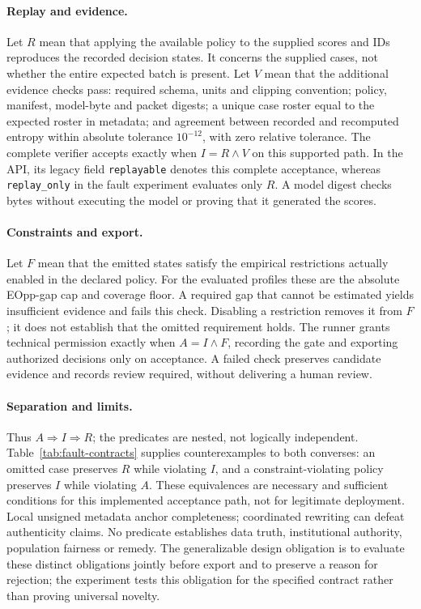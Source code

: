 \paragraph{Replay and evidence.}
Let $R$ mean that applying the available policy to the supplied scores and IDs reproduces the recorded decision states. It concerns the supplied cases, not whether the entire expected batch is present. Let $V$ mean that the additional evidence checks pass: required schema, units and clipping convention; policy, manifest, model-byte and packet digests; a unique case roster equal to the expected roster in metadata; and agreement between recorded and recomputed entropy within absolute tolerance $10^{-12}$, with zero relative tolerance. The complete verifier accepts exactly when $I=R\land V$ on this supported path. In the API, its legacy field \texttt{replayable} denotes this complete acceptance, whereas \texttt{replay\_only} in the fault experiment evaluates only $R$. A model digest checks bytes without executing the model or proving that it generated the scores.

\paragraph{Constraints and export.}
Let $F$ mean that the emitted states satisfy the empirical restrictions actually enabled in the declared policy. For the evaluated profiles these are the absolute EOpp-gap cap and coverage floor. A required gap that cannot be estimated yields insufficient evidence and fails this check. Disabling a restriction removes it from $F$; it does not establish that the omitted requirement holds. The runner grants technical permission exactly when $A=I\land F$, recording the gate and exporting authorized decisions only on acceptance. A failed check preserves candidate evidence and records review required, without delivering a human review.

\paragraph{Separation and limits.}
Thus $A\Rightarrow I\Rightarrow R$; the predicates are nested, not logically independent. Table~\ref{tab:fault-contracts} supplies counterexamples to both converses: an omitted case preserves $R$ while violating $I$, and a constraint-violating policy preserves $I$ while violating $A$. These equivalences are necessary and sufficient conditions for this implemented acceptance path, not for legitimate deployment. Local unsigned metadata anchor completeness; coordinated rewriting can defeat authenticity claims. No predicate establishes data truth, institutional authority, population fairness or remedy. The generalizable design obligation is to evaluate these distinct obligations jointly before export and to preserve a reason for rejection; the experiment tests this obligation for the specified contract rather than proving universal novelty.

